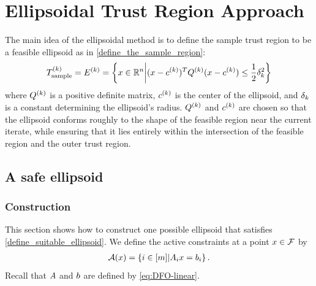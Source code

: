 

\section{Ellipsoidal Trust Region Approach}\label{sec:ellipsoidal}

The main idea of the ellipsoidal method is to define the sample trust region to be a feasible ellipsoid as in \cref{define_the_sample_region}:
\begin{align*}
{T_{\text{sample}}^{(k)}} = {E^{(k)}} = \left\{x \in \mathbb R^n \bigg | (x - c^{(k)})^T {Q^{(k)}} (x - c^{(k)}) \le \frac 1 2 \delta_k^2 \right\}
\end{align*}
where ${Q^{(k)}}$ is a positive definite matrix, $c^{(k)}$ is the center of the ellipsoid, and $\delta_k$ is a constant determining the ellipsoid's radius.   
${Q^{(k)}}$ and $c^{(k)}$ are chosen so that the ellipsoid conforms roughly to the shape of the feasible region near the current iterate, 
while ensuring that it lies entirely within the intersection of the feasible region and the outer trust region.



\subsection{A safe ellipsoid}

\subsubsection{Construction}
\label{the_safe_ellipsoid}

This section shows how to construct one possible ellipsoid that satisfies \cref{define_suitable_ellipsoid}.
We define the active constraints at a point $x \in {\mathcal F}$ by
\begin{align}
{\mathcal A}(x) = \left\{i \in [m] | {{A}}_ix = {{b}}_i \right\}. \label{define_activei}
\end{align}
Recall that ${A}$ and ${b}$ are defined by \cref{eq:DFO-linear}.

